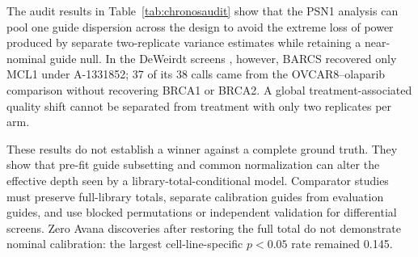 The audit results in Table~\ref{tab:chronosaudit} show that the PSN1 analysis
can pool one guide dispersion across the design to
avoid the extreme loss of power produced by separate two-replicate variance
estimates while retaining a near-nominal guide null.  In the DeWeirdt screens
\citep{deweirdt2020isogenic}, however, BARCS recovered only MCL1 under
A-1331852; 37 of its 38 calls came from the OVCAR8--olaparib comparison without
recovering BRCA1 or BRCA2.  A global treatment-associated quality shift cannot
be separated from treatment with only two replicates per arm.

These results do not establish a winner against a complete ground truth.
They show that pre-fit guide subsetting and common normalization can alter the
effective depth seen by a library-total-conditional model.  Comparator studies
must preserve full-library totals, separate calibration guides from evaluation
guides, and use blocked permutations or independent validation for
differential screens.  Zero Avana discoveries after restoring the full total
do not demonstrate nominal calibration: the largest cell-line-specific
$p<0.05$ rate remained 0.145.
